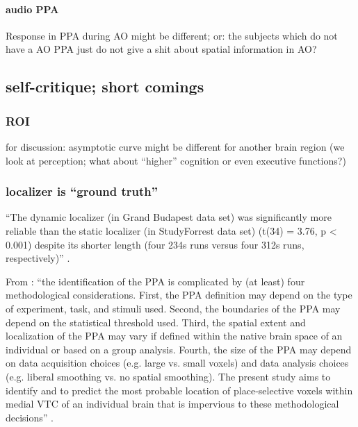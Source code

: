 \paragraph{audio PPA}

Response in PPA during AO might be different; or: the subjects which do not have
a AO PPA just do not give a shit about spatial information in AO?


\subsection{self-critique; short comings}


\subsubsection{ROI}


for discussion: asymptotic curve might be different for another brain region
(we look at perception; what about ``higher'' cognition or even executive
functions?)


\subsubsection{localizer is ``ground truth''}


``The dynamic localizer (in Grand Budapest data set) was significantly more
reliable than the static localizer (in StudyForrest data set) (t(34) = 3.76, p <
0.001) despite its shorter length (four 234s runs versus four 312s runs,
respectively)'' \citep{jiahui2020predicting}.


From \citep{weiner2018defining}: ``the identification of the PPA is complicated
by (at least) four methodological considerations. First, the PPA definition may
depend on the type of experiment, task, and stimuli used. Second, the boundaries
of the PPA may depend on the statistical threshold used. Third, the spatial
extent and localization of the PPA may vary if defined within the native brain
space of an individual or based on a group analysis. Fourth, the size of the PPA
may depend on data acquisition choices (e.g. large vs. small voxels) and data
analysis choices (e.g. liberal smoothing vs. no spatial smoothing). The present
study aims to identify and to predict the most probable location of
place-selective voxels within medial VTC of an individual brain that is
impervious to these methodological decisions'' \citep{weiner2018defining}.

